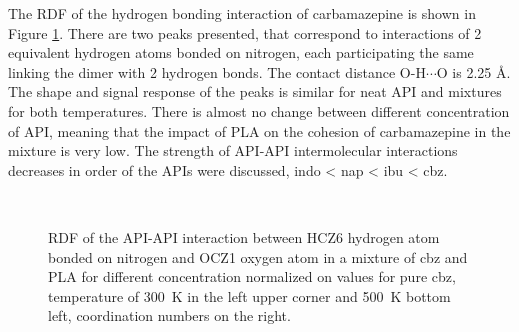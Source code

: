\newpage
The RDF of the hydrogen bonding interaction of carbamazepine is shown in Figure \ref{fig:cbz_RDF_}. There are two peaks presented, that correspond to interactions of 2 equivalent hydrogen atoms bonded on nitrogen, each participating the same linking the dimer with 2 hydrogen bonds. The contact distance O-H$\cdots$O is 2.25 \AA. The shape and signal response of the peaks is similar for neat API and  mixtures for both temperatures. There is almost no change between different concentration of API, meaning that the impact of PLA on the cohesion of carbamazepine in the mixture is very low. The strength of API-API intermolecular interactions decreases in order of the APIs were discussed, indo < nap < ibu < cbz.


\begin{figure}[htb]
	\centering
	\\
	\vspace{-0.3cm}
	\caption{RDF of the API-API interaction between HCZ6 hydrogen atom bonded on nitrogen and OCZ1 oxygen atom in a mixture of cbz and PLA for different concentration normalized on values for pure cbz, temperature of 300~K in the left upper corner and 500~K bottom left, coordination numbers on the right.}
	\label{fig:cbz_RDF_}
\end{figure}


